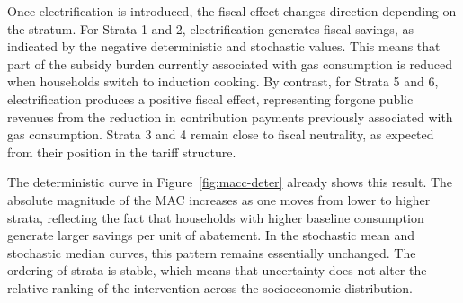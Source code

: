 \documentclass[authoryear,preprint,review,10pt]{elsarticle}
\begin{document}
Once electrification is introduced, the fiscal effect changes direction depending on the stratum. For Strata 1 and 2, electrification generates fiscal savings, as indicated by the negative deterministic and stochastic values. This means that part of the subsidy burden currently associated with gas consumption is reduced when households switch to induction cooking. By contrast, for Strata 5 and 6, electrification produces a positive fiscal effect, representing forgone public revenues from the reduction in contribution payments previously associated with gas consumption. Strata 3 and 4 remain close to fiscal neutrality, as expected from their position in the tariff structure.

\begin{table}[H]
\centering
\caption{Fiscal impact per household of cooking electrification under different scenarios}
\label{tab:fiscal_impact}

\end{table}

The deterministic curve in Figure~\ref{fig:macc-deter} already shows this result. The absolute magnitude of the MAC increases as one moves from lower to higher strata, reflecting the fact that households with higher baseline consumption generate larger savings per unit of abatement. In the stochastic mean and stochastic median curves, this pattern remains essentially unchanged. The ordering of strata is stable, which means that uncertainty does not alter the relative ranking of the intervention across the socioeconomic distribution.
\end{document}

